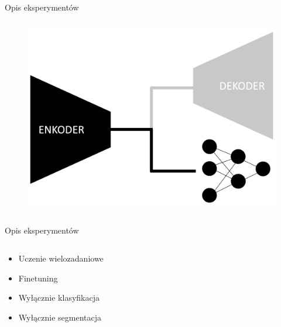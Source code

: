 \documentclass[10pt]{beamer}
\begin{document}
\begin{frame}{Opis eksperymentów}
\begin{columns}
        \begin{column}{0.5\textwidth}
            \begin{figure}
                \includegraphics[width=\textwidth]{images/archs/only-classif.png}
            \end{figure}
        \end{column}
    \end{columns}
\end{frame}\begin{frame}{Opis eksperymentów}
    \begin{columns}
        \begin{column}{0.5\textwidth}
            \begin{itemize}
               \item Uczenie wielozadaniowe
               \item Finetuning
               \item Wyłącznie klasyfikacja
               \item Wyłącznie segmentacja
            \end{itemize}
        \end{column}


\end{columns}
\end{frame}
\end{document}
